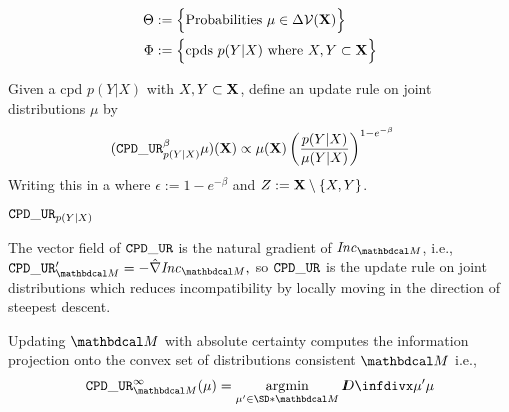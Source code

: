 \documentclass{article}
\begin{document}
\begin{align*}
    \Theta &:=
        \Big\{
        \text{Probabilities}~ \mu \in \Delta \mathcal V(\mathbf{X})
        \Big\} \\
    \Phi &:= \Big\{ \text{cpds}~ p(Y|X)
        \text{ where }  X, Y \subset \mathbf{X} \Big\}
\end{align*}

Given a cpd $p(Y|X)$ with $X,Y \subset \mathbf{X}$,
define an update rule on joint distributions $\mu$ by
\begin{align*}
    (\mathtt{CPD\_UR}_{p(Y|X)}^\beta \mu) (\mathbf{X}) &\propto
        \mu(\mathbf{X}) \left(\frac{p(Y|X)}{\mu(Y|X)}\right)^{1 - e^{-\beta}}
\end{align*}
Writing this in a
where $\epsilon := 1-e^{-\beta}$ and $Z := \mathbf{X} \setminus \{X,Y\}$.

\begin{prop}
    $\mathtt{CPD\_UR}_{p(Y|X)}$
\end{prop}

\begin{prop}
    The vector field of $\mathtt{CPD\_UR}$ is the natural gradient of $\Inc_{\dg M}$, i.e.,
    $
        \tauur'_{\dg M} = - \hat \nabla \Inc_{\dg M},
    $
    so $\mathtt{CPD\_UR}$ is the update rule on joint distributions which reduces incompatibility by locally moving in the direction of steepest descent.
\end{prop}

\begin{prop}
        Updating $\dg M$ with absolute certainty computes the information projection onto the convex set of distributions consistent $\dg M$ i.e.,
        $$\displaystyle
            \tauur_{\dg M}^\infty(\mu) = \argmin_{\mu' \in \SD*{\dg M}} \kldiv{\mu'}{\mu}
        $$

\end{prop}
\end{document}
